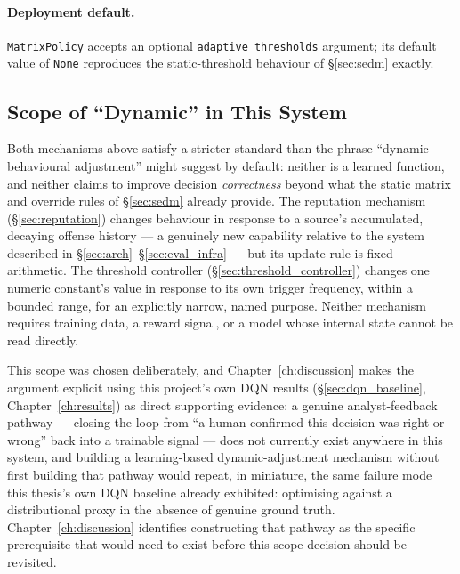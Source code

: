 \paragraph{Deployment default.}
\texttt{MatrixPolicy} accepts an optional \texttt{adaptive\_thresholds}
argument; its default value of \texttt{None} reproduces the static-threshold
behaviour of \S\ref{sec:sedm} exactly.

\subsection{Scope of ``Dynamic'' in This System}

Both mechanisms above satisfy a stricter standard than the phrase ``dynamic
behavioural adjustment'' might suggest by default: neither is a learned
function, and neither claims to improve decision \emph{correctness} beyond
what the static matrix and override rules of \S\ref{sec:sedm} already
provide. The reputation mechanism (\S\ref{sec:reputation}) changes
behaviour in response to a source's accumulated, decaying offense history —
a genuinely new capability relative to the system described in
\S\ref{sec:arch}--\S\ref{sec:eval_infra} — but its update rule is fixed
arithmetic. The threshold controller (\S\ref{sec:threshold_controller})
changes one numeric constant's value in response to its own trigger
frequency, within a bounded range, for an explicitly narrow, named purpose.
Neither mechanism requires training data, a reward signal, or a model whose
internal state cannot be read directly.

This scope was chosen deliberately, and Chapter~\ref{ch:discussion} makes
the argument explicit using this project's own DQN results
(\S\ref{sec:dqn_baseline}, Chapter~\ref{ch:results}) as direct supporting
evidence: a genuine analyst-feedback pathway — closing the loop from ``a
human confirmed this decision was right or wrong'' back into a trainable
signal — does not currently exist anywhere in this system, and building a
learning-based dynamic-adjustment mechanism without first building that
pathway would repeat, in miniature, the same failure mode this thesis's own
DQN baseline already exhibited: optimising against a distributional proxy
in the absence of genuine ground truth. Chapter~\ref{ch:discussion}
identifies constructing that pathway as the specific prerequisite that
would need to exist before this scope decision should be revisited.
